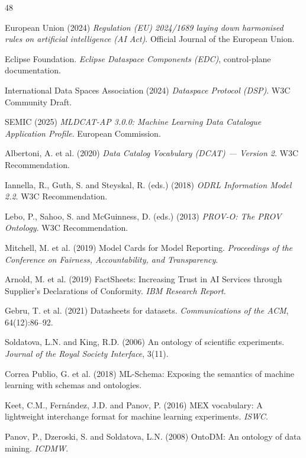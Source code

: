 \documentclass[11pt,a4paper]{article}
\begin{document}
\begin{thebibliography}{48}

 European Union (2024) \emph{Regulation (EU) 2024/1689 laying down harmonised rules on artificial intelligence (AI Act)}. Official Journal of the European Union.

 Eclipse Foundation. \emph{Eclipse Dataspace Components (EDC)}, control-plane documentation.

 International Data Spaces Association (2024) \emph{Dataspace Protocol (DSP)}. W3C Community Draft.

 SEMIC (2025) \emph{MLDCAT-AP 3.0.0: Machine Learning Data Catalogue Application Profile}. European Commission.

 Albertoni, A. et al. (2020) \emph{Data Catalog Vocabulary (DCAT) --- Version 2}. W3C Recommendation.

 Iannella, R., Guth, S. and Steyskal, R. (eds.) (2018) \emph{ODRL Information Model 2.2}. W3C Recommendation.

 Lebo, P., Sahoo, S. and McGuinness, D. (eds.) (2013) \emph{PROV-O: The PROV Ontology}. W3C Recommendation.

 Mitchell, M. et al. (2019) Model Cards for Model Reporting. \emph{Proceedings of the Conference on Fairness, Accountability, and Transparency}.

 Arnold, M. et al. (2019) FactSheets: Increasing Trust in AI Services through Supplier's Declarations of Conformity. \emph{IBM Research Report}.

 Gebru, T. et al. (2021) Datasheets for datasets. \emph{Communications of the ACM}, 64(12):86--92.

 Soldatova, L.N. and King, R.D. (2006) An ontology of scientific experiments. \emph{Journal of the Royal Society Interface}, 3(11).

 Correa Publio, G. et al. (2018) ML-Schema: Exposing the semantics of machine learning with schemas and ontologies.

 Keet, C.M., Fernández, J.D. and Panov, P. (2016) MEX vocabulary: A lightweight interchange format for machine learning experiments. \emph{ISWC}.

 Panov, P., Dzeroski, S. and Soldatova, L.N. (2008) OntoDM: An ontology of data mining. \emph{ICDMW}.


\end{thebibliography}
\end{document}
